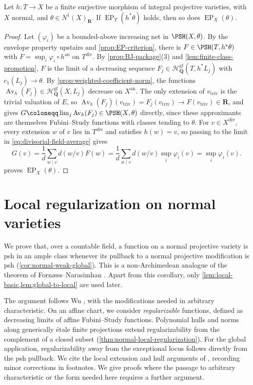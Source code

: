 \documentclass[11pt,a4paper]{article}
\newcommand{\an}{\mathrm{an}}          %
\newcommand{\divv}{\mathrm{div}}       %
\newcommand{\vtriv}{v_{\mathrm{triv}}} %
\newcommand{\EP}{\operatorname{EP}}
\newcommand{\Av}{\operatorname{Av}}
\begin{document}
\begin{theorem}\label{thm:finite-normal-descent}
Let $h\colon T\to X$ be a finite surjective morphism of integral projective varieties, with $X$ normal, and $\theta\in N^1(X)_{\mathbf R}$. If $\EP_T(h^*\theta)$ holds, then so does $\EP_X(\theta)$.
\end{theorem}

\begin{proof}
Let $(\varphi_i)$ be a bounded-above increasing net in $\PSH(X,\theta)$. By the envelope property upstairs and \cref{prop:EP-criterion}, there is $F\in\PSH(T,h^*\theta)$ with $F=\sup_i\varphi_i\circ h^{\an}$ on $T^{\divv}$. By \cref{prop:BJ-package}(3) and \cref{lem:finite-class-promotion}, $F$ is the limit of a decreasing sequence $F_j\in\mathcal{H}^{\mathrm{gf}}_{\mathbf{Q}}(T,h^*L_j)$ with $c_1(L_j)\to\theta$. By \cref{prop:weighted-coefficient-norm}, the functions $\Av_h(F_j)\in\mathcal{H}^{\mathrm{gf}}_{\mathbf{Q}}(X,L_j)$ decrease on $X^{\an}$. The only extension of $\vtriv$ is the trivial valuation of $E$, so $\Av_h(F_j)(\vtriv)=F_j(\vtriv)\to F(\vtriv)\in\mathbf R$, and \cite[Definition~4.1]{BJ22} gives $G\coloneqq\lim_j\Av_h(F_j)\in\PSH(X,\theta)$ directly, since these approximants are themselves Fubini--Study functions with classes tending to $\theta$. For $v\in X^{\divv}$, every extension $w$ of $v$ lies in $T^{\divv}$ and satisfies $h(w)=v$, so passing to the limit in \eqref{eq:divisorial-field-average} gives
\[
 G(v)=\frac1d\sum_{w\mid v}d(w/v)F(w)=\frac1d\sum_{w\mid v}d(w/v)\sup_i\varphi_i(v)=\sup_i\varphi_i(v).
\]
 proves $\EP_X(\theta)$.
\end{proof}

\section{Local regularization on normal varieties}\label{sec:normal-local-regularization}

We prove that, over a countable field, a function on a normal projective variety is psh in an ample class whenever its pullback to a normal projective modification is psh (\cref{cor:normal-weak-global}). This is a non-Archimedean analogue of the theorem of Forn\ae ss--Narasimhan \cite{FN80}. Apart from this corollary, only \cref{lem:local-basic,lem:global-to-local} are used later.

The argument follows Wu \cite{Wu26}, with the modifications needed in arbitrary characteristic. On an affine chart, we consider \emph{regularizable} functions, defined as decreasing limits of affine Fubini--Study functions. Polynomial hulls and norms along generically \'etale finite projections extend regularizability from the complement of a closed subset (\cref{thm:normal-local-regularization}). For the global application, regularizability away from the exceptional locus follows directly from the psh pullback. We cite the local extension and hull arguments of \cite{Wu26}, recording minor corrections in footnotes. We give proofs where the passage to arbitrary characteristic or the form needed here requires a further argument.
\end{document}
